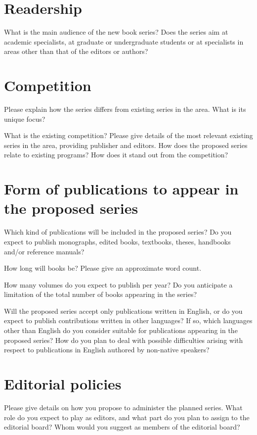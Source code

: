 \documentclass{article}
\begin{document}
\section{Readership}

What is the main audience of the new book series? Does the series
aim at academic specialists, at graduate or undergraduate students
or at specialists in areas other than that of the editors or authors?


\section{Competition}

Please explain how the series differs from existing series in the
area. What is its unique focus?

What is the existing competition? Please give details of the most
relevant existing series in the area, providing publisher and editors.
How does the proposed series relate to existing programs? How does
it stand out from the competition?


\section{Form of publications to appear in the proposed series}

Which kind of publications will be included in the proposed series?
Do you expect to publish monographs, edited books, textbooks, theses,
handbooks and/or reference manuals?

How long will books be? Please give an approximate word count.

How many volumes do you expect to publish per year? Do you anticipate
a limitation of the total number of books appearing in the series?

Will the proposed series accept only publications written in English,
or do you expect to publish contributions written in other languages?
If so, which languages other than English do you consider suitable
for publications appearing in the proposed series? How do you plan
to deal with possible difficulties arising with respect to publications
in English authored by non-native speakers?


\section{Editorial policies}

Please give details on how you propose to administer the planned series.
What role do you expect to play as editors, and what part do you plan
to assign to the editorial board? Whom would you suggest as members
of the editorial board?
\end{document}
